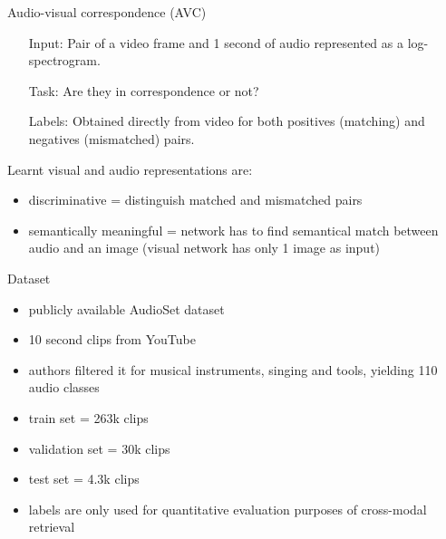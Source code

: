 \documentclass{beamer}
\begin{document}
\begin{frame}{Audio-visual correspondence (AVC)}

\begin{itemize}
\item[Input:] Pair of a video frame and 1 second of audio represented as a log-spectrogram.
\medskip
\item[Task:] Are they in correspondence or not?
\medskip
\item[Labels:] Obtained directly from video for both positives
(matching) and negatives (mismatched) pairs. 
\end{itemize}

\vfill

Learnt visual and audio representations are:
\begin{itemize}
\item discriminative = distinguish matched and mismatched pairs
\item semantically meaningful = network has to find semantical match between audio and an image (visual network has only 1 image as input)
\end{itemize}

\end{frame}
\begin{frame}{Dataset}

\begin{itemize}
\item publicly available AudioSet dataset
\item 10 second clips from YouTube
\item authors filtered it for musical
instruments, singing and tools, yielding 110 audio classes
\item train set = 263k clips
\item validation set = 30k clips
\item test set = 4.3k clips
\item labels are only used for quantitative
evaluation purposes of cross-modal retrieval
\end{itemize}

\end{frame}
\end{document}
